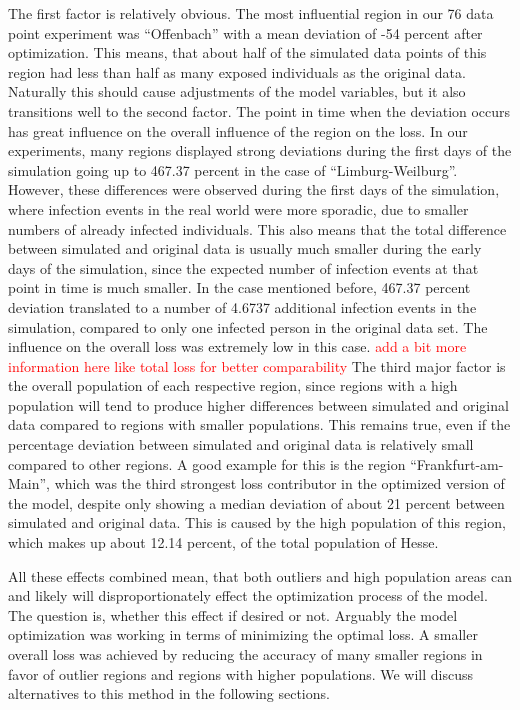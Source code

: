 The first factor is relatively obvious. The most influential region in our 76 data point experiment was ``Offenbach'' with
a mean deviation of -54 percent after optimization. This means, that about half of the simulated data points of this region
had less than half as many exposed individuals as the original data. Naturally this should cause adjustments of the model variables,
but it also transitions well to the second factor. The point in time when the deviation occurs has great influence on the 
overall influence of the region on the loss. In our experiments, many regions displayed strong deviations during the first
days of the simulation going up to 467.37 percent in the case of ``Limburg-Weilburg''. However, these differences were observed
during the first days of the simulation, where infection events in the real world were more sporadic, due to smaller numbers of
already infected individuals. This also means that the total difference between simulated and original data is usually much
smaller during the early days of the simulation, since the expected number of infection events at that point in time is much smaller.
In the case mentioned before, 467.37 percent deviation translated to a number of 4.6737 additional infection events in the simulation,
compared to only one infected person in the original data set. The influence on the overall loss was extremely low in this case.
\textcolor{red}{add a bit more information here like total loss for better comparability} %
The third major factor is the overall population of each respective region, since regions with a high population will tend to
produce higher differences between simulated and original data compared to regions with smaller populations. This remains true, even
if the percentage deviation between simulated and original data is relatively small compared to other regions. A good example for this
is the region ``Frankfurt-am-Main'', which was the third strongest loss contributor in the optimized version of the model, despite
only showing a median deviation of about 21 percent between simulated and original data. This is caused by the high population of
this region, which makes up about 12.14 percent, of the total population of Hesse.\newline

All these effects combined mean, that both outliers and high population areas can and likely will disproportionately effect the
optimization process of the model. The question is, whether this effect if desired or not. Arguably the model optimization was
working in terms of minimizing the optimal loss. A smaller overall loss was achieved by reducing the accuracy of many smaller
regions in favor of outlier regions and regions with higher populations. We will discuss alternatives to this method in the
following sections.


